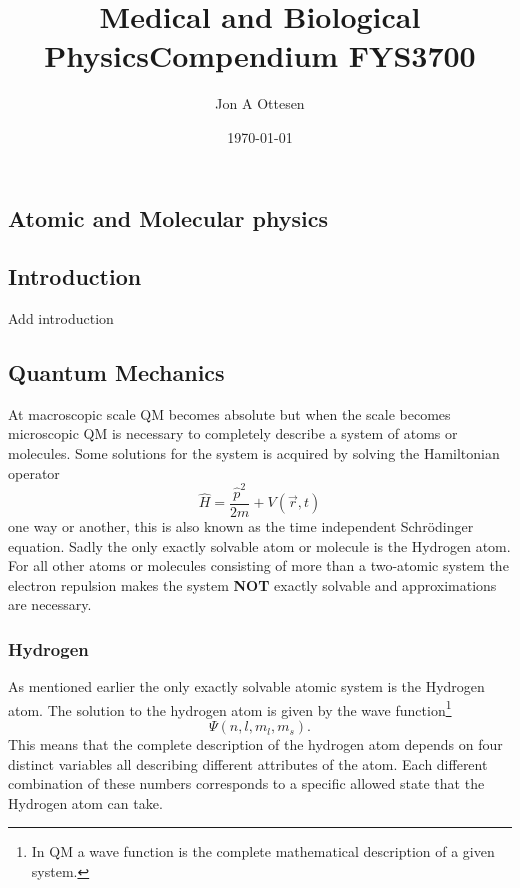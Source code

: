 \documentclass[jmp, amsmath, amssymb, reprint]{article}
\numberwithin{equation}{section}
\newcommand{\lp}{\left(}
\newcommand{\rp}{\right)}
\begin{document}
\title{Medical and Biological Physics}

\author{Jon A Ottesen}
\title{Compendium FYS3700}%
\date{\today}
\maketitle

\newpage
\tableofcontents
\newpage

\begin{multicols}{2}

\section{Atomic and Molecular physics}

\subsection*{Introduction}

Add introduction

\subsection{Quantum Mechanics}

At macroscopic scale QM becomes absolute but when the scale becomes microscopic QM is necessary to completely describe a system of atoms or molecules. Some solutions for the system is acquired by solving the Hamiltonian operator
\begin{equation}
 \hat{H} = \frac{\hat{p}^2}{2m} + V(\vec{r},t)
\end{equation}
one way or another, this is also known as the time independent Schrödinger equation. Sadly the only exactly solvable atom or molecule is the Hydrogen atom. For all other atoms or molecules consisting of more than a two-atomic system the electron repulsion makes the system \textbf{NOT} exactly solvable and approximations are necessary.

\subsubsection{Hydrogen}\label{sec:hydrogen}

As mentioned earlier the only exactly solvable atomic system is the Hydrogen atom. The solution to the hydrogen atom is given by the wave function\footnote{In QM a wave function is the complete mathematical description of a given system.}
\begin{equation}\label{eq:01}
\Psi\lp n,l,m_l, m_s\rp.
\end{equation}
This means that the complete description of the hydrogen atom depends on four distinct variables all describing different attributes of the atom. Each different combination of these numbers corresponds to a specific allowed state that the Hydrogen atom can take.


\end{multicols}
\end{document}

